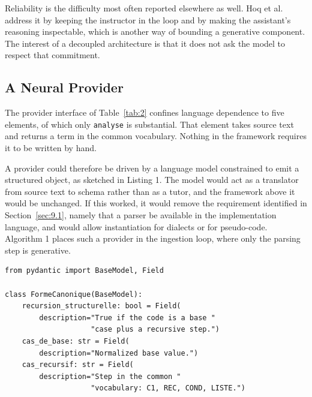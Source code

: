 \documentclass[journal]{IEEEtran}
\begin{document}
Reliability is the difficulty most often reported elsewhere as well. Hoq et al. \cite{b23} address it by keeping the instructor in the loop and by making the assistant's reasoning inspectable, which is another way of bounding a generative component. The interest of a decoupled architecture \cite{b24} is that it does not ask the model to respect that commitment.

\subsection{A Neural Provider}\label{sec:10.1}
The provider interface of Table~\ref{tab:2} confines language dependence to five elements, of which only \texttt{analyse} is substantial. That element takes source text and returns a term in the common vocabulary. Nothing in the framework requires it to be written by hand.

A provider could therefore be driven by a language model constrained to emit a structured object, as sketched in Listing 1. The model would act as a translator from source text to schema rather than as a tutor, and the framework above it would be unchanged. If this worked, it would remove the requirement identified in Section~\ref{sec:9.1}, namely that a parser be available in the implementation language, and would allow instantiation for dialects or for pseudo-code. Algorithm 1 places such a provider in the ingestion loop, where only the parsing step is generative.

\begin{lstlisting}[float=htbp,basicstyle=\footnotesize\ttfamily,framexleftmargin=2pt,caption={Sketch of a neural provider constrained to the common vocabulary.}]
from pydantic import BaseModel, Field

class FormeCanonique(BaseModel):
    recursion_structurelle: bool = Field(
        description="True if the code is a base "
                    "case plus a recursive step.")
    cas_de_base: str = Field(
        description="Normalized base value.")
    cas_recursif: str = Field(
        description="Step in the common "
                    "vocabulary: C1, REC, COND, LISTE.")
\end{lstlisting}
\end{document}
